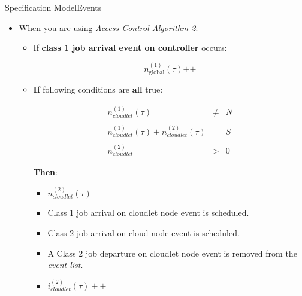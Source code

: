 \documentclass[10pt]{beamer}
\begin{document}
\begin{frame}{Specification Model}{Events}

\begin{itemize}
\item When you are using \textit{Access Control Algorithm 2}:

\begin{itemize}
\item If \textbf{class 1 job arrival event on controller} occurs:

\begin{equation}
n_{\text{global}}^{(1)}(\tau)\texttt{++}
\end{equation}

\item \textbf{If} following conditions are \textbf{all} true:

\begin{equation}
\begin{array} {rcl} 

n_{cloudlet}^{(1)}(\tau) & \neq & N \\\\

n_{cloudlet}^{(1)}(\tau) + n_{cloudlet}^{(2)}(\tau) & = & S \\\\

n_{cloudlet}^{(2)} & > & 0

\end{array}
\end{equation}

\textbf{Then}:

\begin{itemize}
\item $n_{cloudlet}^{(2)}(\tau)--$
\item Class 1 job arrival on cloudlet node event is scheduled.
\item Class 2 job arrival on cloud node event is scheduled.
\item A Class 2 job departure on cloudlet node event is removed from the \textit{event list}.
\item $i_{cloudlet}^{(2)}(\tau)++$
\end{itemize}

\end{itemize}


\end{itemize}
\end{frame}
\end{document}
